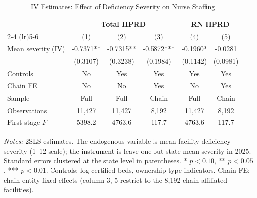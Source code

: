 \begin{table}[H]
\centering
\caption{IV Estimates: Effect of Deficiency Severity on Nurse Staffing}
\label{tab:iv_main}
\begin{threeparttable}
\begin{tabular}{lccccc}
\toprule
& \multicolumn{3}{c}{Total HPRD} & \multicolumn{2}{c}{RN HPRD} \\
\cmidrule(lr){2-4} \cmidrule(lr){5-6}
& (1) & (2) & (3) & (4) & (5) \\
\midrule
Mean severity (IV) & -0.7371** & -0.7315** & -0.5872*** & -0.1960* & -0.0281 \\
& (0.3107) & (0.3238) & (0.1984) & (0.1142) & (0.0981) \\[6pt]
\midrule
Controls & No & Yes & Yes & Yes & Yes \\
Chain FE & No & No & Yes & No & Yes \\
Sample & Full & Full & Chain & Full & Chain \\
Observations & 11,427 & 11,427 & 8,192 & 11,427 & 8,192 \\
First-stage $F$ & 5398.2 & 4763.6 & 117.7 & 4763.6 & 117.7 \\
\bottomrule
\end{tabular}
\begin{tablenotes}[flushleft]
\small
\item \textit{Notes:} 2SLS estimates. The endogenous variable is mean facility deficiency severity (1--12 scale);
the instrument is leave-one-out state mean severity in 2025. Standard errors clustered at the state level
in parentheses. * $p<0.10$, ** $p<0.05$, *** $p<0.01$.
Controls: log certified beds, ownership type indicators. Chain FE: chain-entity fixed effects
(column 3, 5 restrict to the 8,192 chain-affiliated facilities).
\end{tablenotes}
\end{threeparttable}
\end{table}
